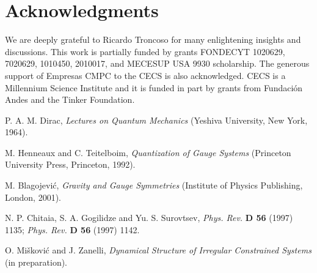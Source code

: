 \documentclass[a4paper,thmsa,11pt]{article}
\begin{document}

\section*{Acknowledgments}

We are deeply grateful to Ricardo Troncoso for many enlightening insights and discussions. This
work is partially funded by grants FONDECYT  1020629, 7020629, 1010450, 2010017, and MECESUP USA
9930 scholarship. The generous support of Empresas CMPC to the CECS is also acknowledged. CECS is
a Millennium Science Institute and it is funded in part by grants from Fundaci\'{o}n Andes and the
Tinker Foundation.


\begin{thebibliography}{9}

  P. A. M. Dirac, \emph{Lectures on Quantum Mechanics}
(Yeshiva University, New York, 1964).

  M. Henneaux and C. Teitelboim, \emph{%
Quantization of Gauge Systems} (Princeton University Press, Princeton, 1992).

  M. Blagojevi\'{c}, \emph{Gravity and Gauge Symmetries}
(Institute of Physics Publishing, London, 2001).

  N. P. Chitaia, S. A. Gogilidze and
Yu. S. Surovtsev, \emph{Phys. Rev.} \textbf{D 56} (1997) 1135; \emph{Phys.
Rev.} \textbf{D 56} (1997) 1142.

  O. Mi\v {s}kovi\'{c} and J. Zanelli, \emph{Dynamical Structure of Irregular Constrained Systems} (in preparation).
\end{thebibliography}
\end{document}
